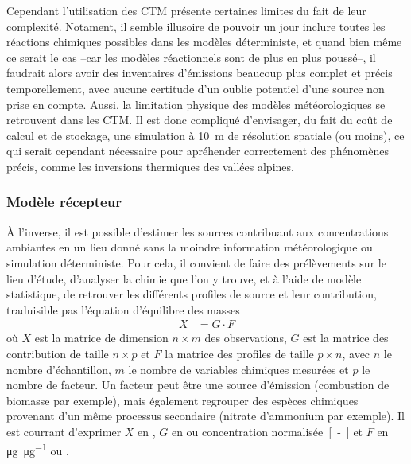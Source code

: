 Cependant l'utilisation des CTM présente certaines limites du fait de leur complexité.
Notament, il semble illusoire de pouvoir un jour inclure toutes les réactions chimiques
possibles dans les modèles déterministe, et quand bien même ce serait le cas --car les
modèles réactionnels sont de plus en plus poussé--, il faudrait alors avoir des
inventaires d'émissions beaucoup plus complet et précis temporellement, avec aucune
certitude d'un oublie potentiel d'une source non prise en compte.  Aussi, la limitation
physique des modèles météorologiques se retrouvent dans les CTM. Il est donc compliqué
d'envisager, du fait du coût de calcul et de stockage, une simulation à \SI{10}{m} de
résolution spatiale (ou moins), ce qui serait cependant nécessaire pour apréhender
correctement des phénomènes précis, comme les inversions thermiques des vallées alpines.

\subsubsection{Modèle récepteur}%
\label{ssub:model_recepteur}

À l'inverse, il est possible d'estimer les sources contribuant aux concentrations
ambiantes en un lieu donné sans la moindre information météorologique ou simulation
déterministe. Pour cela, il convient de faire des prélèvements sur le lieu d'étude,
d'analyser la chimie que l'on y trouve, et à l'aide de modèle statistique, de retrouver
les différents profiles de source et leur contribution, traduisible pas l'équation
d'équilibre des masses
\begin{align}
    \label{eq:mass_balance}
    X &= G \cdot F
\end{align}
où $X$ est la matrice de dimension $n\times m$ des observations, $G$ est la matrice des
contribution de taille $n\times p$ et $F$ la matrice des profiles de taille $p \times n$,
avec $n$ le nombre d'échantillon, $m$ le nombre de variables chimiques mesurées et $p$ le
nombre de facteur. Un facteur peut être une source d'émission (combustion de biomasse par
exemple), mais également regrouper des espèces chimiques provenant d'un même processus
secondaire (nitrate d'ammonium par exemple).
Il est courrant d'exprimer $X$ en \si{\ugm}, $G$ en \si{\ugm} ou concentration
normalisée~\si{[-]} et $F$ en \si{\micro\g\per\micro\g} ou \si{\ugm}.

